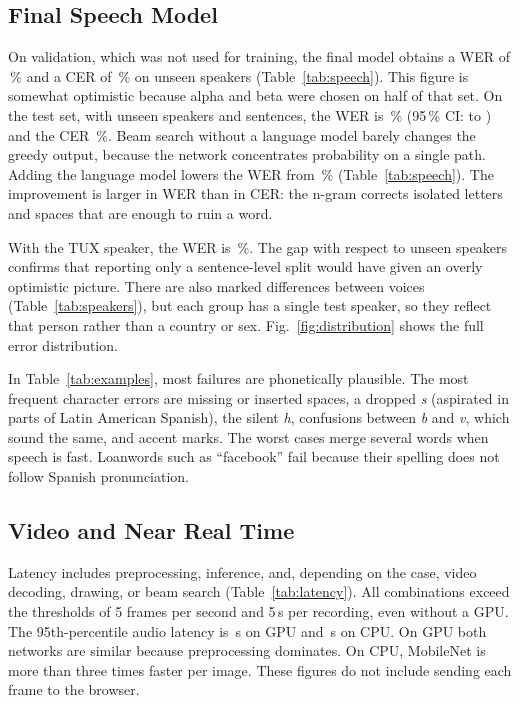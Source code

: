\begin{table}[t]
\centering
\caption{End-to-end latency on the demonstration machine}
\label{tab:latency}

\end{table}

\subsection{Final Speech Model}

On validation, which was not used for training, the final model obtains a WER of \ValSlrWer\,\% and a CER of \ValSlrCer\,\% on unseen speakers (Table~\ref{tab:speech}). This figure is somewhat optimistic because alpha and beta were chosen on half of that set. On the test set, with unseen speakers and sentences, the WER is \SlrWer\,\% (95\,\% CI: \SlrWerLow{} to \SlrWerHigh) and the CER \SlrCer\,\%. Beam search without a language model barely changes the greedy output, because the network concentrates probability on a single path. Adding the language model lowers the WER from \SlrWerGreedy\,\% (Table~\ref{tab:speech}). The improvement is larger in WER than in CER: the n-gram corrects isolated letters and spaces that are enough to ruin a word.

With the TUX speaker, the WER is \TuxWer\,\%. The gap with respect to unseen speakers confirms that reporting only a sentence-level split would have given an overly optimistic picture. There are also marked differences between voices (Table~\ref{tab:speakers}), but each group has a single test speaker, so they reflect that person rather than a country or sex. Fig.~\ref{fig:distribution} shows the full error distribution.

In Table~\ref{tab:examples}, most failures are phonetically plausible. The most frequent character errors are missing or inserted spaces, a dropped \emph{s} (aspirated in parts of Latin American Spanish), the silent \emph{h}, confusions between \emph{b} and \emph{v}, which sound the same, and accent marks. The worst cases merge several words when speech is fast. Loanwords such as ``facebook'' fail because their spelling does not follow Spanish pronunciation.

\subsection{Video and Near Real Time}

Latency includes preprocessing, inference, and, depending on the case, video decoding, drawing, or beam search (Table~\ref{tab:latency}). All combinations exceed the thresholds of 5 frames per second and 5\,s per recording, even without a GPU. The 95th-percentile audio latency is \AudioLat\,s on GPU and \AudioLatCpu\,s on CPU. On GPU both networks are similar because preprocessing dominates. On CPU, MobileNet is more than three times faster per image. These figures do not include sending each frame to the browser.

